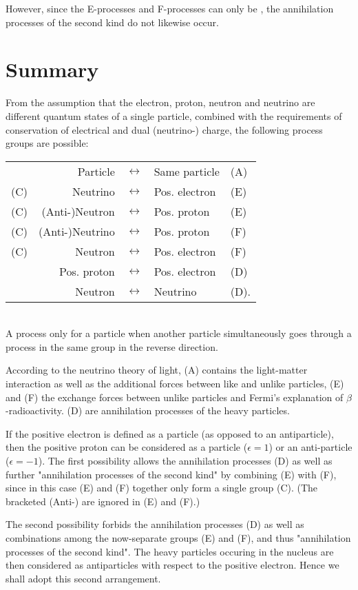 \documentclass{article}
\begin{document}
However, since the E-processes and F-processes can only be , the annihilation processes of the second kind do not likewise occur.

\section*{Summary}

From the assumption that the electron, proton, neutron and neutrino are different quantum states of a single particle, combined with the requirements of conservation of electrical and dual (neutrino-) charge, the following process groups are possible:\\
\begin{tabular}{rrlll}
\, & Particle & $\leftrightarrow$ & Same particle & (A)\\
(C) & Neutrino & $\leftrightarrow$ & Pos. electron & (E)\\
(C) & (Anti-)Neutron & $\leftrightarrow$ & Pos. proton & (E)\\
(C) & (Anti-)Neutrino & $\leftrightarrow$ & Pos. proton & (F)\\
(C) & Neutron & $\leftrightarrow$ & Pos. electron & (F)\\
\, & Pos. proton & $\leftrightarrow$ & Pos. electron & (D)\\
\, & Neutron & $\leftrightarrow$ & Neutrino & (D).
\end{tabular}\\
A process only  for a particle when another particle simultaneously goes through a process in the same group in the reverse direction.

According to the neutrino theory of light, (A) contains the light-matter interaction as well as the additional forces between like and unlike particles, (E) and (F) the exchange forces between unlike particles and Fermi's explanation of $\beta$-radioactivity. (D) are annihilation processes of the heavy particles.

If the positive electron is defined as a particle (as opposed to an antiparticle), then the positive proton can be considered as a particle ($\epsilon=1$) or an anti-particle ($\epsilon=-1$). The first possibility allows the annihilation processes (D) as well as further "annihilation processes of the second kind" by combining (E) with (F), since in this case (E) and (F) together only form a single group (C).  (The bracketed (Anti-) are ignored in (E) and (F).)

The second possibility forbids the annihilation processes (D) as well as combinations among the now-separate groups (E) and (F), and thus "annihilation processes of the second kind". The heavy particles occuring in the nucleus are then considered as antiparticles with respect to the positive electron. Hence we shall adopt this second arrangement.
\end{document}

